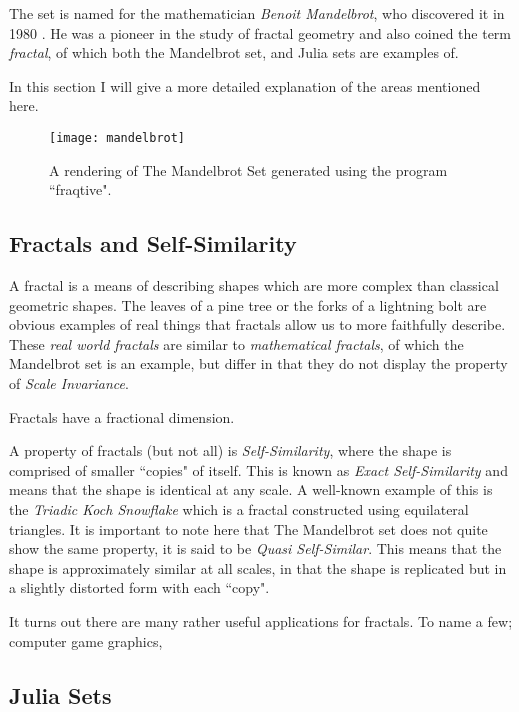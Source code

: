 The set is named for the mathematician \textit{Benoit Mandelbrot}, who discovered it in 1980 \cite{fracnature , fractimg}. He was a pioneer in the study of 
fractal geometry and also coined the term \textit{fractal}, of which both the Mandelbrot set, and Julia sets are examples of. 

In this section I will give a more detailed explanation of the areas mentioned here. 

\begin{figure}[h]
  \caption{A rendering of The Mandelbrot Set generated using the program ``fraqtive"\cite{fraqtive}.}
  \label{fig:mandelimg}
  \centering
    \texttt{[image: mandelbrot]}
\end{figure}

\subsection*{Fractals and Self-Similarity} 
A fractal is a means of describing shapes which are more complex than classical geometric shapes. The leaves of a pine tree or the forks of a 
lightning bolt are obvious examples of real things that fractals allow us to more faithfully describe. 
These \textit{real world fractals} are similar to \textit{mathematical fractals}, 
of which the Mandelbrot set is an example, but differ in that they do not display the property of \textit{Scale Invariance}. 

Fractals have a fractional dimension. %
 
A property of fractals (but not all) is \textit{Self-Similarity}, where the shape is comprised of smaller ``copies" of itself. 
This is known as \textit{Exact Self-Similarity} and means that the shape is identical at any scale.
A well-known example of this is the \textit{Triadic Koch Snowflake} which is a fractal constructed using equilateral triangles. 
It is important to note here that The Mandelbrot set does not quite show the same property, it is said to be 
\textit{Quasi Self-Similar}. This means that the shape is approximately similar at all scales, in that the shape is replicated but in a slightly distorted
form with each ``copy".

It turns out there are many rather useful applications for fractals. To name a few; computer game graphics, %

\subsection*{Julia Sets}

